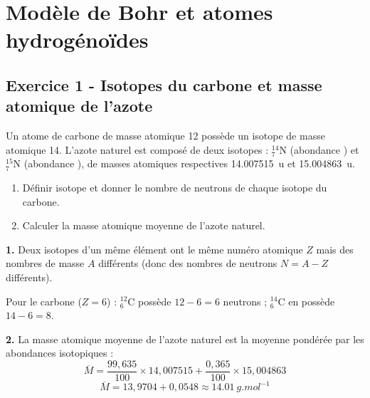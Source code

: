 \documentclass[12pt,a4paper]{article}
\begin{document}
\newpage

\section{Modèle de Bohr et atomes hydrogénoïdes}

\subsection*{Exercice 1 - Isotopes du carbone et masse atomique de l'azote \niveau{\facile}}

\begin{boiteexercice}
Un atome de carbone de masse atomique 12 possède un isotope de masse atomique 14. L'azote naturel est composé de deux isotopes : $^{14}_{7}$N (abondance ) et $^{15}_{7}$N (abondance ), de masses atomiques respectives \qty{14.007515}{u} et \qty{15.004863}{u}.

\begin{enumerate}
  \item Définir isotope et donner le nombre de neutrons de chaque isotope du carbone.
  \item Calculer la masse atomique moyenne de l'azote naturel.
\end{enumerate}
\end{boiteexercice}

\begin{boitecorrige}
\textbf{1.} Deux isotopes d'un même élément ont le même numéro atomique $Z$ mais des nombres de masse $A$ différents (donc des nombres de neutrons $N = A - Z$ différents).

Pour le carbone ($Z = 6$) : $^{12}_{6}$C possède $12 - 6 = 6$ neutrons ; $^{14}_{6}$C en possède $14 - 6 = 8$.

\textbf{2.} La masse atomique moyenne de l'azote naturel est la moyenne pondérée par les abondances isotopiques :
\[
\overline{M} = \frac{99{,}635}{100} \times 14{,}007515 + \frac{0{,}365}{100} \times 15{,}004863
\]
\[
\overline{M} = 13{,}9704 + 0{,}0548 \approx \qty{14.01}{g.mol^{-1}}
\]
\end{boitecorrige}
\end{document}
